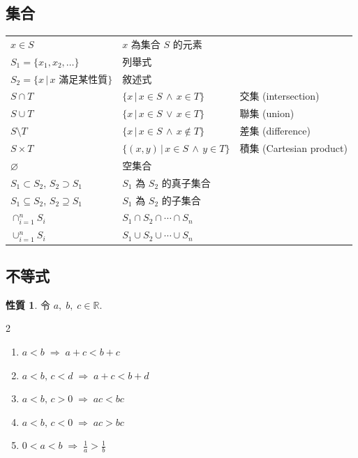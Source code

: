 \documentclass[12pt]{extarticle}
\newcommand{\ds}{\displaystyle}
\newcommand{\ie}{\;\Longrightarrow\;}
\theoremstyle{definition}
\newtheorem*{prp}{性質}
\begin{document}
\subsection*{集合}

\begin{table}[!htbp]
  \centering
  \begin{tabular}{lll}
    \toprule
    $x\in S$ & $x$ 為集合 $S$ 的元素 &  \\
    $S_1 =\{x_1, x_2, \ldots\}$ & 列舉式   &  \\
    $S_2 =\{ x\,|\, x \text{ 滿足某性質}\}$ & 敘述式 & \\
    $S\cap T$ & $\{x\,|\, x\in S\,\wedge\,x\in T\}$ & 交集 (intersection)    \\
    $S\cup T$ & $\{x\,|\, x\in S\,\vee\,x\in T\}$ & 聯集 (union)    \\
    $S\setminus T$ & $\{x\,|\, x\in S\,\wedge\,x\not\in T\}$ & 差集 (difference)   \\
    $S\times T$ & $\{(x, y)\,|\, x\in S\,\wedge\,y\in T\}$ & 積集 (Cartesian product)  \\
    $\varnothing$ & 空集合 & \\
    $S_1\subset S_2$, $S_2\supset S_1$ & $S_1$ 為 $S_2$ 的真子集合 & \\
    $S_1\subseteq S_2$, $S_2\supseteq S_1$ & $S_1$ 為 $S_2$ 的子集合 & \\
    $\ds\cap_{i=1}^n S_i$ & $S_1\cap S_2\cap\cdots\cap S_n$ &    \\
    $\ds\cup_{i=1}^n S_i$ & $S_1\cup S_2\cup\cdots\cup S_n$ &    \\
    \bottomrule
  \end{tabular}
\end{table}

\subsection*{不等式}
\begin{prp}
  令 $a,\;b,\;c\in\mathbb{R}$. 
  \setlength{\columnsep}{-20mm}
  \begin{multicols}{2}
    \begin{enumerate}\setlength\itemsep{0em}
      \item $\ds a < b \ie a + c < b + c$
      \item $\ds a < b, \,c < d \ie a + c < b + d$
      \item $\ds a < b, \,c > 0 \ie a c < b c$
      \item $\ds a < b, \,c < 0 \ie a c > b c$
      \item $\ds0 < a < b \ie \frac{1}{a} > \frac{1}{b}$
    \end{enumerate}
  \end{multicols}
\end{prp}
\end{document}

